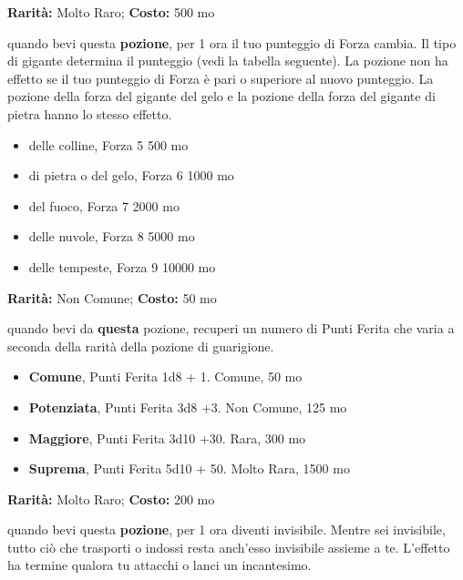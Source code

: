 \begin{multicols}{2}

\textbf{Rarità:} Molto Raro; \textbf{Costo:} 500 mo

quando bevi questa \textbf{pozione}, per 1 ora il tuo punteggio di Forza cambia. Il tipo di gigante determina il punteggio (vedi la tabella seguente). La pozione non ha effetto se il tuo punteggio di Forza è pari o superiore al nuovo punteggio. La pozione della forza del gigante del gelo e la pozione della forza del gigante di pietra hanno lo stesso effetto.

\begin{itemize} \setlength\itemsep{0em}
\item delle colline, Forza 5 500 mo
\item di pietra o del gelo, Forza 6 1000 mo
\item del fuoco, Forza 7 2000 mo
\item delle nuvole, Forza 8 5000 mo
\item delle tempeste, Forza 9 10000 mo
\end{itemize}


\textbf{Rarità:} Non Comune; \textbf{Costo:} 50 mo

quando bevi da \textbf{questa} pozione, recuperi un numero di Punti Ferita che varia a seconda della rarità della pozione di guarigione.

\begin{itemize} \setlength\itemsep{0em}
\item \textbf{Comune}, Punti Ferita 1d8 + 1. Comune, 50 mo
\item \textbf{Potenziata}, Punti Ferita 3d8 +3. Non Comune, 125 mo
\item \textbf{Maggiore}, Punti Ferita 3d10 +30. Rara, 300 mo
\item \textbf{Suprema}, Punti Ferita 5d10 + 50. Molto Rara, 1500 mo
\end{itemize}


\textbf{Rarità:} Molto Raro; \textbf{Costo:} 200 mo

quando bevi questa \textbf{pozione}, per 1 ora diventi invisibile. Mentre sei invisibile, tutto ciò che trasporti o indossi resta anch'esso invisibile assieme a te. L'effetto ha termine qualora tu attacchi o lanci un incantesimo.



\end{multicols}
